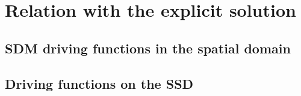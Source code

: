 \newpage
\section{Relation with the explicit solution}
\subsection{SDM driving functions in the spatial domain}
\subsection{Driving functions on the SSD}
	
%
